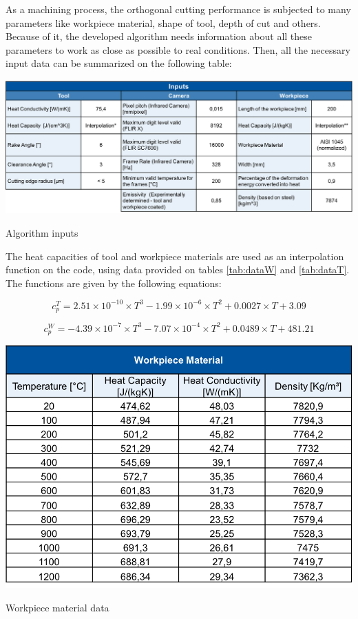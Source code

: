 		As a machining process, the orthogonal cutting performance is subjected to many parameters like workpiece material, shape of tool, depth of cut and others. Because of it, the developed algorithm needs information about all these parameters to work as close as possible to real conditions. Then, all the necessary input data can be summarized on the following table:

		\begin{table}[H]
			\centering
			\captionsetup{justification=centering}
			\includegraphics[scale = 0.6]{Imagens/Inputs.png}
			\caption{Algorithm inputs \cite{augspurger2016experimental}}
			\label{tab:inputs}
		\end{table}

		The heat capacities of tool and workpiece materials are used as an interpolation function on the code, using data provided on tables \ref{tab:dataW} and \ref{tab:dataT}. The functions are given by the following equations:

		\begin{equation} 
		\label{eq_heatCapTool}
			c_{p}^{T} = 2.51\times 10^{- 10}\times T^{3} - 1.99\times 10^{- 6} \times T^{2} + 0.0027 \times T + 3.09
		\end{equation}

		\begin{equation} 
		\label{eq_heatCapWork}
			c_{p}^{W} = -4.39\times 10^{- 7}\times T^{3} - 7.07\times 10^{- 4} \times T^{2} + 0.0489 \times T + 481.21
		\end{equation}

		\begin{table}[h]
			\centering
			\captionsetup{justification=centering}
			\includegraphics[scale = 0.6]{Imagens/dataWorkpiece.png}
			\caption{Workpiece material data \cite{augspurger2016experimental}}
			\label{tab:dataW}
		\end{table}

